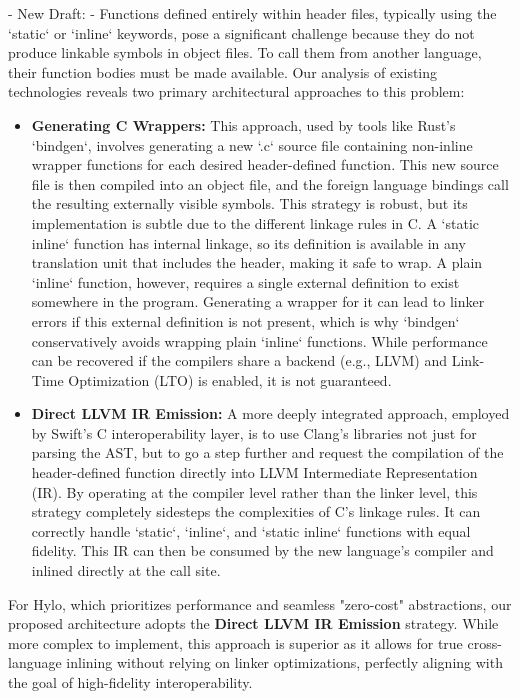 - New Draft: -
Functions defined entirely within header files, typically using the `static` or `inline` keywords, pose a significant challenge because they do not produce linkable symbols in object files. To call them from another language, their function bodies must be made available. Our analysis of existing technologies reveals two primary architectural approaches to this problem:
\begin{itemize}
    \item \textbf{Generating C Wrappers:} This approach, used by tools like Rust's `bindgen`, involves generating a new `.c` source file containing non-inline wrapper functions for each desired header-defined function. This new source file is then compiled into an object file, and the foreign language bindings call the resulting externally visible symbols. This strategy is robust, but its implementation is subtle due to the different linkage rules in C. A `static inline` function has internal linkage, so its definition is available in any translation unit that includes the header, making it safe to wrap. A plain `inline` function, however, requires a single external definition to exist somewhere in the program. Generating a wrapper for it can lead to linker errors if this external definition is not present, which is why `bindgen` conservatively avoids wrapping plain `inline` functions. While performance can be recovered if the compilers share a backend (e.g., LLVM) and Link-Time Optimization (LTO) is enabled, it is not guaranteed.
    \item \textbf{Direct LLVM IR Emission:} A more deeply integrated approach, employed by Swift's C interoperability layer, is to use Clang's libraries not just for parsing the AST, but to go a step further and request the compilation of the header-defined function directly into LLVM Intermediate Representation (IR). By operating at the compiler level rather than the linker level, this strategy completely sidesteps the complexities of C's linkage rules. It can correctly handle `static`, `inline`, and `static inline` functions with equal fidelity. This IR can then be consumed by the new language's compiler and inlined directly at the call site.
\end{itemize}
For Hylo, which prioritizes performance and seamless "zero-cost" abstractions, our proposed architecture adopts the \textbf{Direct LLVM IR Emission} strategy. While more complex to implement, this approach is superior as it allows for true cross-language inlining without relying on linker optimizations, perfectly aligning with the goal of high-fidelity interoperability.
 
